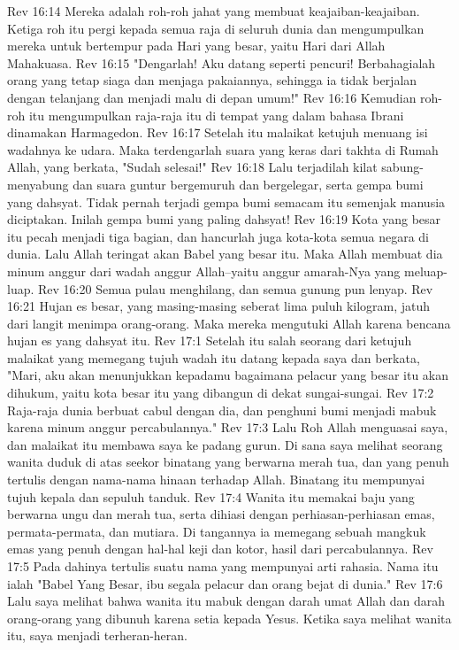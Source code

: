 Rev 16:14  Mereka adalah roh-roh jahat yang membuat keajaiban-keajaiban. Ketiga roh itu pergi kepada semua raja di seluruh dunia dan mengumpulkan mereka untuk bertempur pada Hari yang besar, yaitu Hari dari Allah Mahakuasa.
Rev 16:15  "Dengarlah! Aku datang seperti pencuri! Berbahagialah orang yang tetap siaga dan menjaga pakaiannya, sehingga ia tidak berjalan dengan telanjang dan menjadi malu di depan umum!"
Rev 16:16  Kemudian roh-roh itu mengumpulkan raja-raja itu di tempat yang dalam bahasa Ibrani dinamakan Harmagedon.
Rev 16:17  Setelah itu malaikat ketujuh menuang isi wadahnya ke udara. Maka terdengarlah suara yang keras dari takhta di Rumah Allah, yang berkata, "Sudah selesai!"
Rev 16:18  Lalu terjadilah kilat sabung-menyabung dan suara guntur bergemuruh dan bergelegar, serta gempa bumi yang dahsyat. Tidak pernah terjadi gempa bumi semacam itu semenjak manusia diciptakan. Inilah gempa bumi yang paling dahsyat!
Rev 16:19  Kota yang besar itu pecah menjadi tiga bagian, dan hancurlah juga kota-kota semua negara di dunia. Lalu Allah teringat akan Babel yang besar itu. Maka Allah membuat dia minum anggur dari wadah anggur Allah--yaitu anggur amarah-Nya yang meluap-luap.
Rev 16:20  Semua pulau menghilang, dan semua gunung pun lenyap.
Rev 16:21  Hujan es besar, yang masing-masing seberat lima puluh kilogram, jatuh dari langit menimpa orang-orang. Maka mereka mengutuki Allah karena bencana hujan es yang dahsyat itu.
Rev 17:1  Setelah itu salah seorang dari ketujuh malaikat yang memegang tujuh wadah itu datang kepada saya dan berkata, "Mari, aku akan menunjukkan kepadamu bagaimana pelacur yang besar itu akan dihukum, yaitu kota besar itu yang dibangun di dekat sungai-sungai.
Rev 17:2  Raja-raja dunia berbuat cabul dengan dia, dan penghuni bumi menjadi mabuk karena minum anggur percabulannya."
Rev 17:3  Lalu Roh Allah menguasai saya, dan malaikat itu membawa saya ke padang gurun. Di sana saya melihat seorang wanita duduk di atas seekor binatang yang berwarna merah tua, dan yang penuh tertulis dengan nama-nama hinaan terhadap Allah. Binatang itu mempunyai tujuh kepala dan sepuluh tanduk.
Rev 17:4  Wanita itu memakai baju yang berwarna ungu dan merah tua, serta dihiasi dengan perhiasan-perhiasan emas, permata-permata, dan mutiara. Di tangannya ia memegang sebuah mangkuk emas yang penuh dengan hal-hal keji dan kotor, hasil dari percabulannya.
Rev 17:5  Pada dahinya tertulis suatu nama yang mempunyai arti rahasia. Nama itu ialah "Babel Yang Besar, ibu segala pelacur dan orang bejat di dunia."
Rev 17:6  Lalu saya melihat bahwa wanita itu mabuk dengan darah umat Allah dan darah orang-orang yang dibunuh karena setia kepada Yesus. Ketika saya melihat wanita itu, saya menjadi terheran-heran.
